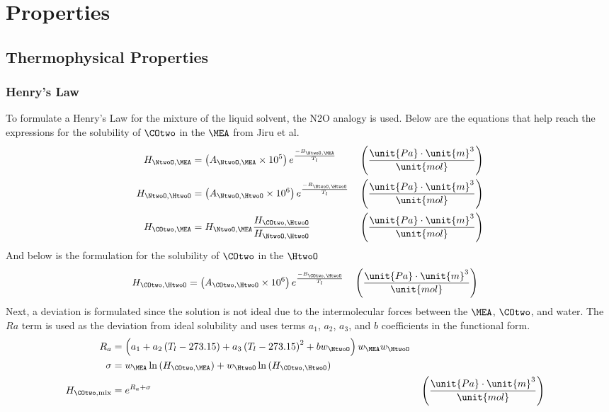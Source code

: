 \appendix
    \vspace{1cm}
    \section{Properties}\label{sec:properties}
        \vspace{1cm}
        \subsection{Thermophysical Properties}
            \vspace{1cm}
            \subsubsection{Henry's Law} 
                To formulate a Henry's Law for the mixture of the liquid solvent, the N2O analogy is used. Below are the equations that help reach the expressions for the solubility of $\COtwo$ in the $\MEA$ from Jiru et al. \cite{Jiru2012}
                \begin{align}
                    H_{\NtwoO,\MEA} &= \left(A_{\NtwoO,\MEA} \times 10^5\right) e^{\frac{-B_{\NtwoO,\MEA}}{T_l}} && \left(\frac{\unit{Pa} \cdot \unit{m}^3}{\unit{mol}} \right)\\
                    H_{\NtwoO,\HtwoO} &= \left(A_{\NtwoO,\HtwoO} \times 10^6\right) e^{\frac{-B_{\NtwoO,\HtwoO}}{T_l}} && \left(\frac{\unit{Pa} \cdot \unit{m}^3}{\unit{mol}} \right)\\
                    H_{\COtwo,\MEA} &= H_{\NtwoO,\MEA} \frac{H_{\COtwo, \HtwoO}}{H_{\NtwoO,\HtwoO}} && \left(\frac{\unit{Pa} \cdot \unit{m}^3}{\unit{mol}} \right)
                \end{align}
                And below is the formulation for the solubility of $\COtwo$ in the $\HtwoO$
                \begin{align}
                    H_{\COtwo, \HtwoO} &= \left(A_{\COtwo, \HtwoO} \times 10^6\right) e^{\frac{-B_{\COtwo, \HtwoO}}{T_l}} && \left(\frac{\unit{Pa} \cdot \unit{m}^3}{\unit{mol}} \right)
                \end{align}
                Next, a deviation is formulated since the solution is not ideal due to the intermolecular forces between the $\MEA$, $\COtwo$, and water. The $Ra$ term is used as the deviation from ideal solubility and uses terms $a_1$, $a_2$, $a_3$, and $b$ coefficients in the functional form.
                \begin{align}
                    R_{a} &= \left(a_1+a_2 \left(T_l-273.15\right)+a_3 \left(T_l-273.15\right)^2+b w_{\HtwoO}\right) w_{\MEA} w_{\HtwoO} \\
                    \sigma &= w_{\MEA} \ln\left(H_{\COtwo,\MEA}\right)+w_{\HtwoO} \ln\left(H_{\COtwo,\HtwoO}\right) \\
                    H_{\COtwo,\text{mix}} &= e^{R_{a} + \sigma} && \left(\frac{\unit{Pa} \cdot \unit{m}^3}{\unit{mol}} \right)
                \end{align}

